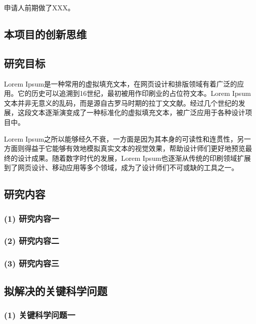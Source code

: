 \documentclass[UTF8,12pt,AutoFakeBold=2]{ctexart}
\begin{document}
申请人前期做了XXX\cite{zhang2024one, zhang2024another}。

\subsection{本项目的创新思维}





\subsection{研究目标}

Lorem Ipsum是一种常用的虚拟填充文本，在网页设计和排版领域有着广泛的应用。它的历史可以追溯到16世纪，最初被用作印刷业的占位符文本。Lorem Ipsum文本并非无意义的乱码，而是源自古罗马时期的拉丁文文献。经过几个世纪的发展，这段文本逐渐演变成了一种标准化的虚拟填充文本，被广泛应用于各种设计项目中。

Lorem Ipsum之所以能够经久不衰，一方面是因为其本身的可读性和连贯性，另一方面则得益于它能够有效地模拟真实文本的视觉效果，帮助设计师们更好地预览最终的设计成果。随着数字时代的发展，Lorem Ipsum也逐渐从传统的印刷领域扩展到了网页设计、移动应用等多个领域，成为了设计师们不可或缺的工具之一。

\subsection{研究内容}

\subsubsection*{(1) 研究内容一}

\subsubsection*{(2) 研究内容二}

\subsubsection*{(3) 研究内容三}

\subsection{拟解决的关键科学问题}
\subsubsection*{(1) 关键科学问题一}
\end{document}
